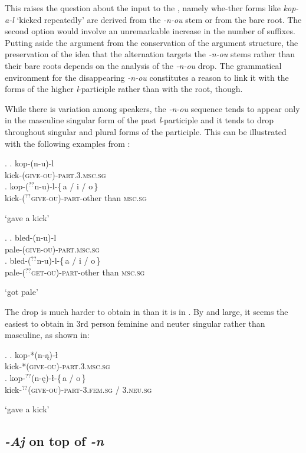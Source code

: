 This raises the question about the input to the , namely whe-ther forms like \textit{kop-a-l} `kicked repeatedly' are derived from the \textit{-n-ou} stem or from the bare root. The second option would involve an unremarkable increase in the number of suffixes. Putting aside the argument from the conservation of the argument structure, the preservation of the idea that 
the alternation targets the \textit{-n-ou} stems rather than their bare roots depends on the analysis of the \textit{-n-ou} drop. The grammatical environment for the disappearing \textit{-n-ou} constitutes a reason to link it with the forms of the higher \textit{l}-participle rather than with the root, though.
\par
While there is variation among  speakers, the \textit{-n-ou} sequence tends to appear only in the masculine singular form of the past \textit{l}-participle and it tends to drop throughout singular and plural forms of the participle. This can be illustrated with the following examples from \cite{LTN}:

\ex.
\ag. kop-(n-u)-l \\
kick-\textsc{(give-ou)-part.3.msc.sg}\\
\bg. kop-($^{??}${n-u)-l}-{\{\,a / i / o\,\}}\\
kick-($^{??}$\textsc{give-ou)-part}-{other than \textsc{msc.sg}}\\
\strut `gave a kick'

\ex.
\ag. bled-(n-u)-l \\
pale-\textsc{(give-ou)-part.msc.sg}\\
\bg. bled-($^{??}$n-u)-l-{\{\,a / i / o\,\}}\\ 
pale-\textsc{($^{??}$get-ou)-part}-other than \textsc{msc.sg}\\
\strut `got pale'

The drop is much harder to obtain in  than it is in . By and large, it seems the easiest to obtain in 3rd person feminine and neuter singular rather than masculine, as shown in:

\ex. 
\ag. kop-*(n-\k{a})-\l{}\\
kick-*\textsc{(give-ou)-part.3.msc.sg}\\
\bg. kop-$^{??}$(n-\k{e})-\l{}-{\{\,a / o\,\}}\\
kick-$^{??}$\textsc{(give-ou)-part-{3.fem.sg / 3.neu.sg}}\\
\strut `gave a kick'

\subsection{\textit{-Aj} on top of \textit{-n}}


